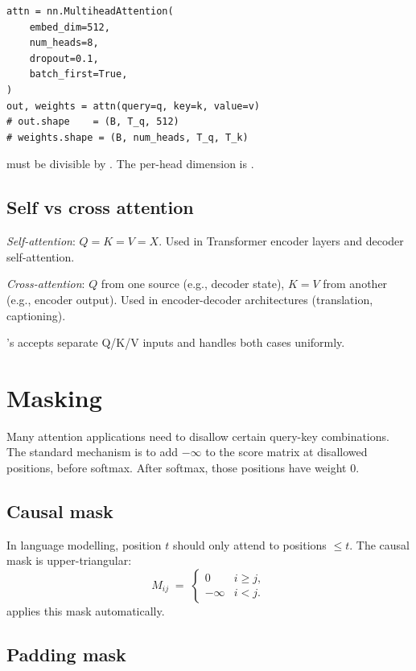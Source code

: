 \begin{lstlisting}[style=lucid,language=LucidPython]
attn = nn.MultiheadAttention(
    embed_dim=512,
    num_heads=8,
    dropout=0.1,
    batch_first=True,
)
out, weights = attn(query=q, key=k, value=v)
# out.shape    = (B, T_q, 512)
# weights.shape = (B, num_heads, T_q, T_k)
\end{lstlisting}

 must be divisible by . The
per-head dimension is .

\subsection{Self vs cross attention}
\label{ssec:attention:self_vs_cross}

\emph{Self-attention}: $Q = K = V = X$. Used in Transformer
encoder layers and decoder self-attention.

\emph{Cross-attention}: $Q$ from one source (e.g., decoder
state), $K = V$ from another (e.g., encoder output). Used in
encoder-decoder architectures (translation, captioning).

\Lucid's  accepts separate Q/K/V inputs
and handles both cases uniformly.

\section{Masking}
\label{sec:attention:masking}

Many attention applications need to disallow certain query-key
combinations. The standard mechanism is to add $-\infty$ to the
score matrix at disallowed positions, before softmax. After
softmax, those positions have weight 0.

\subsection{Causal mask}
\label{ssec:attention:causal_mask}

In language modelling, position $t$ should only attend to
positions $\leq t$. The causal mask is upper-triangular:
\[
M_{ij} \;=\; \begin{cases}
0 & i \geq j, \\
-\infty & i < j.
\end{cases}
\]
 applies this
mask automatically.

\subsection{Padding mask}
\label{ssec:attention:padding_mask}

